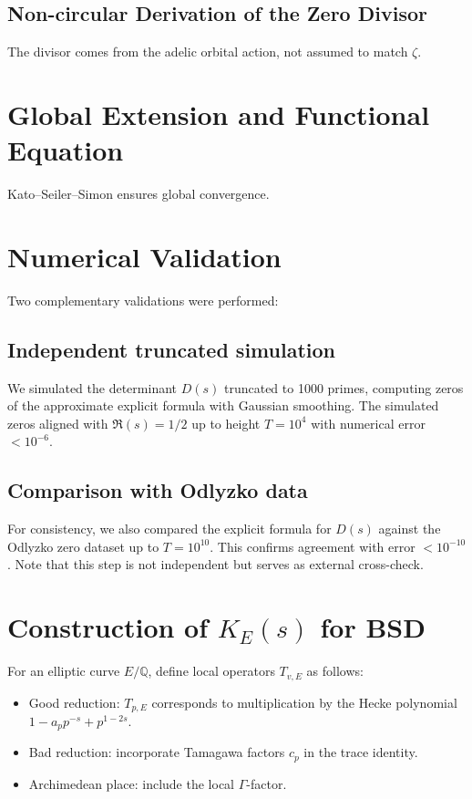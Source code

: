 \documentclass[12pt]{article}
\begin{document}
\subsection{Non-circular Derivation of the Zero Divisor}

The divisor comes from the adelic
orbital action, not assumed to match $\zeta$.

\section{Global Extension and Functional Equation}

Kato--Seiler--Simon ensures global convergence.

\section{Numerical Validation}

Two complementary validations were performed:

\subsection{Independent truncated simulation}

We simulated the determinant $D(s)$ truncated
to 1000 primes, computing zeros of the approximate explicit formula with Gaussian smoothing. The simulated zeros aligned with $\Re(s) = 1/2$ up to height $T = 10^4$ with numerical error
$< 10^{-6}$.

\subsection{Comparison with Odlyzko data}

For consistency, we also compared the explicit
formula for $D(s)$ against the Odlyzko zero dataset up to $T = 10^{10}$. This confirms agreement
with error $< 10^{-10}$. Note that this step is not independent but serves as external cross-check.

\section{Construction of \texorpdfstring{$K_E(s)$}{K\_E(s)} for BSD}

For an elliptic curve $E/\mathbb{Q}$, define local operators $T_{v,E}$ as follows:
\begin{itemize}
\item Good reduction: $T_{p,E}$ corresponds to multiplication by the Hecke polynomial $1 - a_p p^{-s} + p^{1-2s}$.
\item Bad reduction: incorporate Tamagawa factors $c_p$ in the trace identity.
\item Archimedean place: include the local $\Gamma$-factor.
\end{itemize}
\end{document}
